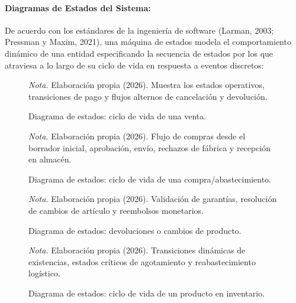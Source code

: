 \documentclass[12pt,a4paper]{article}
\begin{document}
\paragraph{Diagramas de Estados del Sistema:}
De acuerdo con los estándares de la ingeniería de software (Larman, 2003; Pressman y Maxim, 2021), una máquina de estados modela el comportamiento dinámico de una entidad especificando la secuencia de estados por los que atraviesa a lo largo de su ciclo de vida en respuesta a eventos discretos:

\begin{figure}[H]
  \centering
  \caption{Diagrama de estados: ciclo de vida de una venta.}
  \label{fig:estado_ventas}
  \resizebox{0.92\linewidth}{!}{}
  \par\vspace{0.2cm}
  {\raggedright \small \emph{Nota.} Elaboraci\'on propia (2026). Muestra los estados operativos, transiciones de pago y flujos alternos de cancelaci\'on y devoluci\'on.\par}
\end{figure}

\begin{figure}[H]
  \centering
  \caption{Diagrama de estados: ciclo de vida de una compra/abastecimiento.}
  \label{fig:estado_compras}
  \resizebox{0.92\linewidth}{!}{}
  \par\vspace{0.2cm}
  {\raggedright \small \emph{Nota.} Elaboraci\'on propia (2026). Flujo de compras desde el borrador inicial, aprobaci\'on, env\'io, rechazos de f\'abrica y recepci\'on en almac\'en.\par}
\end{figure}

\begin{figure}[H]
  \centering
  \caption{Diagrama de estados: devoluciones o cambios de producto.}
  \label{fig:estado_devoluciones}
  \resizebox{0.92\linewidth}{!}{}
  \par\vspace{0.2cm}
  {\raggedright \small \emph{Nota.} Elaboraci\'on propia (2026). Validaci\'on de garant\'ias, resoluci\'on de cambios de art\'iculo y reembolsos monetarios.\par}
\end{figure}

\begin{figure}[H]
  \centering
  \caption{Diagrama de estados: ciclo de vida de un producto en inventario.}
  \label{fig:estado_inventario}
  \resizebox{0.92\linewidth}{!}{}
  \par\vspace{0.2cm}
  {\raggedright \small \emph{Nota.} Elaboraci\'on propia (2026). Transiciones din\'amicas de existencias, estados cr\'iticos de agotamiento y reabastecimiento log\'istico.\par}
\end{figure}
\end{document}
